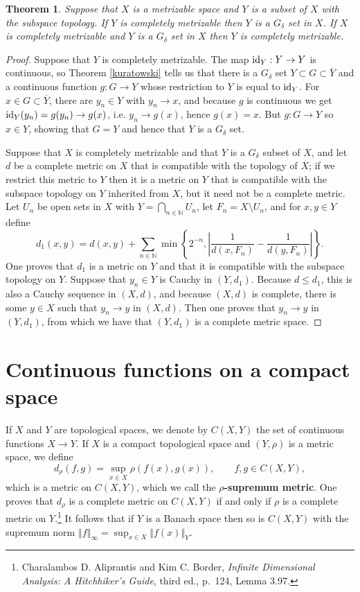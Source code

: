\documentclass{article}
\newcommand{\id}{\ensuremath\mathrm{id}}
\newcommand{\norm}[1]{\left\Vert #1 \right\Vert}
\newtheorem{theorem}{Theorem}
\theoremstyle{definition}
\begin{document}
\begin{theorem}
Suppose that $X$ is a metrizable space and $Y$ is a subset of $X$ with the subspace topology. If $Y$ 
is completely metrizable then $Y$ is a $G_\delta$ set in $X$. If $X$ is completely metrizable and $Y$ is a $G_\delta$ set in $X$ then
$Y$ is completely metrizable.
\label{Polishsubspace}
\end{theorem}
\begin{proof}
Suppose that $Y$ is completely metrizable. The map $\id_Y:Y \to Y$ is continuous, so Theorem \ref{kuratowski} tells
us that there is a $G_\delta$ set $Y \subset G \subset \overline{Y}$ and a continuous function $g:G \to Y$ whose restriction
to $Y$ is equal to $\id_Y$. For $x \in G \subset \overline{Y}$, there are $y_n \in Y$ with $y_n \to x$, and because
$g$ is continuous we get $\id_Y(y_n)=g(y_n) \to g(x)$,  i.e. $y_n \to g(x)$, hence $g(x)=x$. But $g:G \to Y$ so $x \in Y$, showing
that $G = Y$ and hence that $Y$ is a $G_\delta$ set.

Suppose that $X$ is completely metrizable and that $Y$ is a $G_\delta$ subset of $X$,
and let $d$ be a complete metric
on $X$ that is compatible with the topology of $X$;
if we restrict this metric to $Y$ then it is a metric on $Y$ that is compatible with the subspace topology on $Y$ inherited from $X$,
but it need not be a complete metric.
 Let  $U_n$ be open sets in $X$ with $Y = \bigcap_{n \in \mathbb{N}} U_n$, let
 $F_n = X \setminus U_n$, and for $x,y \in Y$ define
\[
d_1(x,y) = d(x,y)+\sum_{n \in \mathbb{N}} \min\left\{2^{-n},\left| \frac{1}{d(x,F_n)}-\frac{1}{d(y,F_n)} \right| \right\}.
\]
One proves that $d_1$ is a metric on $Y$ and that it is compatible with the subspace topology on $Y$. Suppose that
$y_n \in Y$ is Cauchy in $(Y,d_1)$. Because $d \leq d_1$, this is also a Cauchy sequence in $(X,d)$, and because $(X,d)$
is complete, there is some $y \in X$ such that $y_n \to y$ in $(X,d)$. Then one proves that $y_n \to y$ in $(Y,d_1)$, from which
we have that $(Y,d_1)$ is a complete metric space. 
\end{proof}



\section{Continuous functions on a compact space}
\label{CXY}
If $X$ and $Y$ are topological spaces, we denote by $C(X,Y)$ the set of continuous functions $X \to Y$. 
If $X$ is a compact topological space and $(Y,\rho)$ is a metric space, we define 
\[
d_\rho(f,g) = \sup_{x \in X} \rho(f(x),g(x)), \qquad f,g \in C(X,Y),
\]
which is a metric on $C(X,Y)$, which we call
the \textbf{$\rho$-supremum
metric}. One proves that $d_\rho$ is a complete metric on $C(X,Y)$ if and only if
$\rho$ is a complete metric on $Y$.\footnote{Charalambos D. 
Aliprantis and Kim C. Border, {\em Infinite Dimensional Analysis: A Hitchhiker's Guide}, third ed., p.~124, Lemma 3.97.} 
It follows that if $Y$ is a Banach space then so is $C(X,Y)$ with the supremum norm $\norm{f}_\infty = \sup_{x \in X} \norm{f(x)}_Y$.
\end{document}
